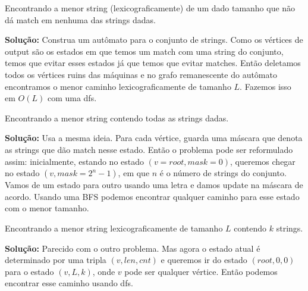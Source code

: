  Encontrando a menor string (lexicograficamente) de um dado tamanho que não dá match em nenhuma das strings dadas.

\textbf{Solução:} Construa um autômato para o conjunto de strings. Como os vértices de output são os estados em que temos um match com uma string do conjunto, temos que evitar esses estados já que temos que evitar matches. Então deletamos todos os vértices ruins das máquinas e no grafo remanescente do autômato encontramos o menor caminho lexicograficamente de tamanho $L$. Fazemos isso em $O(L)$ com uma dfs.

 Encontrando a menor string contendo todas as strings dadas.

\textbf{Solução:} Usa a mesma ideia. Para cada vértice, guarda uma máscara que denota as strings que dão match nesse estado. Então o problema pode ser reformulado assim: inicialmente, estando no estado $(v = root, mask=0)$, queremos chegar no estado $(v, mask=2^n-1)$, em que $n$ é o número de strings do conjunto. Vamos de um estado para outro usando uma letra e damos update na máscara de acordo. Usando uma BFS podemos encontrar qualquer caminho para esse estado com o menor tamanho.

 Encontrando a menor string lexicograficamente de tamanho $L$ contendo $k$ strings.

\textbf{Solução:} Parecido com o outro problema. Mas agora o estado atual é determinado por uma tripla $(v, len, cnt)$ e queremos ir do estado $(root, 0, 0)$ para o estado $(v, L, k)$, onde $v$ pode ser qualquer vértice. Então podemos encontrar esse caminho usando dfs.